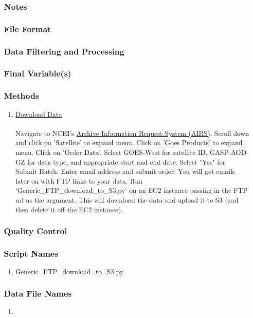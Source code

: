 \subsubsection*{Notes}

\subsubsection*{File Format}

\subsubsection*{Data Filtering and Processing}

\subsubsection*{Final Variable(s)}

\subsubsection*{Methods}

\begin{enumerate}
\item \underline{Download Data}\\\\
Navigate to NCEI's \href{https://www.ncdc.noaa.gov/has/has.dsselect}{Archive Information Request System (AIRS)}. Scroll down and click on 'Satellite' to expand menu. Click on 'Goes Products' to expand menu. Click on 'Order Data'. Select GOES-West for satellite ID, GASP-AOD-GZ for data type, and appropriate start and end date. Select "Yes" for Submit Batch. Enter email address and submit order. You will get emails later on with FTP links to your data. Run `Generic_FTP_download_to_S3.py` on an EC2 instance passing in the FTP url as the argument. This will download the data and upload it to S3 (and then delete it off the EC2 instance).
\end{enumerate}

\subsubsection*{Quality Control}

\subsubsection*{Script Names}

\begin{enumerate}
\item Generic_FTP_download_to_S3.py
\end{enumerate}

\subsubsection*{Data File Names}

\begin{enumerate}
\item 
\end{enumerate}
